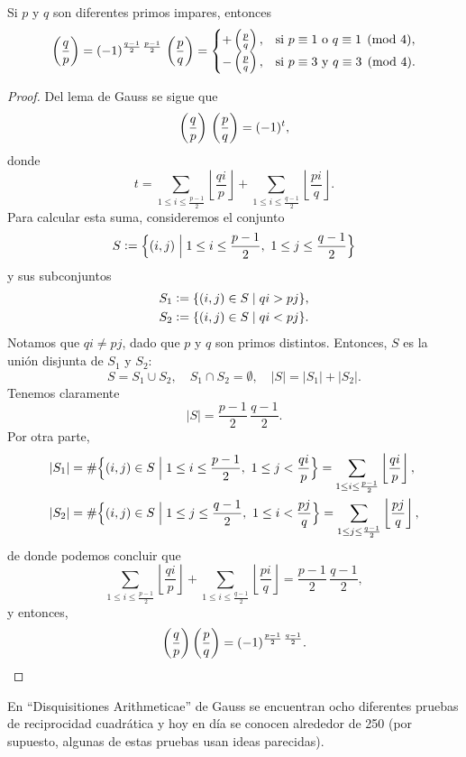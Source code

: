 \documentclass{article}
\theoremstyle{plain}
\begin{document}
\begin{teorema}
  Si $p$ y $q$ son diferentes primos impares, entonces
  \[ \left(\frac{q}{p}\right) = (-1)^{\frac{q-1}{2}\,\frac{p-1}{2}}\,\left(\frac{p}{q}\right) = \begin{cases}
      +\left(\frac{p}{q}\right), & \text{si }p\equiv 1\text{ o }q\equiv 1 \pmod{4},\\
      -\left(\frac{p}{q}\right), & \text{si } p\equiv 3\text{ y }q\equiv 3 \pmod{4}.
    \end{cases} \]

  \begin{proof}
    Del lema de Gauss se sigue que
    $$\left(\frac{q}{p}\right)\,\left(\frac{p}{q}\right) = (-1)^t,$$
    donde
    $$t = \sum_{1 \le i \le \frac{p-1}{2}} \left\lfloor\frac{qi}{p}\right\rfloor + \sum_{1 \le i \le \frac{q-1}{2}} \left\lfloor\frac{pi}{q}\right\rfloor.$$
    Para calcular esta suma, consideremos el conjunto
    $$S \mathrel{\mathop:}= \Bigl\{ (i,j) \Bigm| 1 \le i \le \frac{p-1}{2}, ~ 1 \le j \le \frac{q-1}{2} \Bigr\}$$
    y sus subconjuntos
    \begin{align*}
      S_1 & \mathrel{\mathop:}= \{ (i,j) \in S \mid qi > pj \},\\
      S_2 & \mathrel{\mathop:}= \{ (i,j) \in S \mid qi < pj \}.
    \end{align*}
    Notamos que $qi \ne pj$, dado que $p$ y $q$ son primos distintos. Entonces,
    $S$ es la unión disjunta de $S_1$ y $S_2$:
    $$S = S_1 \cup S_2, \quad S_1\cap S_2 = \emptyset, \quad |S| = |S_1| + |S_2|.$$
    Tenemos claramente
    $$|S| = \frac{p-1}{2}\,\frac{q-1}{2}.$$
    Por otra parte,
    \begin{align*}
      |S_1| & = \#\Bigl\{ (i,j) \in S \Bigm| 1 \le i \le \frac{p-1}{2}, ~ 1 \le j < \frac{qi}{p} \Bigr\} = \sum_{1 \le i \le \frac{p-1}{2}} \left\lfloor\frac{qi}{p}\right\rfloor,\\
      |S_2| & = \# \Bigl\{ (i,j) \in S \Bigm| 1 \le j \le \frac{q-1}{2}, ~ 1 \le i < \frac{pj}{q} \Bigr\} = \sum_{1 \le j \le \frac{q-1}{2}} \left\lfloor\frac{pj}{q}\right\rfloor,
    \end{align*}
    de donde podemos concluir que
$$\sum_{1 \le i \le \frac{p-1}{2}} \left\lfloor\frac{qi}{p}\right\rfloor + \sum_{1 \le i \le \frac{q-1}{2}} \left\lfloor\frac{pi}{q}\right\rfloor = \frac{p-1}{2}\,\frac{q-1}{2},$$
y entonces,
\[ \left(\frac{q}{p}\right)\left(\frac{p}{q}\right) = (-1)^{\frac{p-1}{2}\,\frac{q-1}{2}}. \qedhere \]
  \end{proof}
\end{teorema}

En ``Disquisitiones Arithmeticae'' de Gauss se encuentran ocho diferentes
pruebas de reciprocidad cuadrática y hoy en día se conocen alrededor de 250 (por
supuesto, algunas de estas pruebas usan ideas parecidas).
\end{document}
